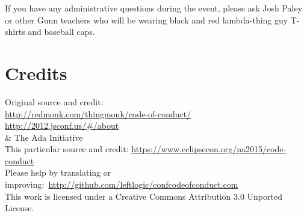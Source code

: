 \documentclass[12pt,onesided,letterpaper]{article}
\begin{document}
If you have any administrative questions during the event, please ask Josh Paley or other Gunn teachers who will be wearing black and red lambda-thing guy T-shirts and baseball caps.

\section*{Credits}
Original source and credit:\\
\href{http://redmonk.com/thingmonk/code-of-conduct/}{http://redmonk.com/thingmonk/code-of-conduct/}\\
\href{http://2012.jsconf.us/#/about}{http://2012.jsconf.us/\#/about}\\
\& The Ada Initiative\\

This particular source and credit: \href{https://www.eclipsecon.org/na2015/code-conduct}{https://www.eclipsecon.org/na2015/code-conduct}\\

Please help by translating or improving: \href{http://github.com/leftlogic/confcodeofconduct.com}{http://github.com/leftlogic/confcodeofconduct.com}\\

This work is licensed under a Creative Commons Attribution 3.0 Unported License.
\end{document}
